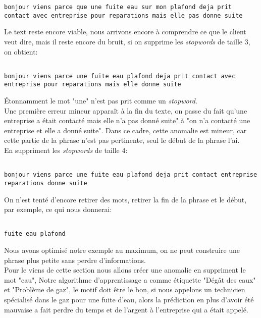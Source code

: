 \begin{lstlisting}
bonjour viens parce que une fuite eau sur mon plafond deja prit contact avec entreprise pour reparations mais elle pas donne suite
\end{lstlisting}

\pagebreak

Le text reste encore viable, nous arrivons encore à comprendre ce que le client veut dire, mais il reste encore du bruit, si on supprime les \textit{stopwords} de taille 3, on obtient:\\

\begin{lstlisting}

bonjour viens parce une fuite eau plafond deja prit contact avec entreprise pour reparations mais elle donne suite

\end{lstlisting}


Étonnamment le mot "une" n'est pas prit comme un \textit{stopword}.\\
Une première erreur mineur apparaît à la fin du texte, on passe du fait qu'une entreprise a était contacté mais elle n'a pas donné suite" à "on n'a contacté une entreprise et elle a donné suite".
Dans ce cadre, cette anomalie est mineur, car cette partie de la phrase n'est pas pertinente, seul le début de la phrase l'ai.\\
En suppriment les \textit{stopwords} de taille 4:\\
\begin{lstlisting}

bonjour viens parce une fuite eau plafond deja prit contact entreprise reparations donne suite

\end{lstlisting}

On n'est tenté d'encore retirer des mots, retirer la fin de la phrase et le début, par exemple, ce qui nous donnerai:\\

\begin{lstlisting}

fuite eau plafond

\end{lstlisting}

Nous avons optimisé notre exemple au maximum, on ne peut construire une phrase plus petite sans perdre d'informations.\\
\linebreak
Pour le viens de cette section nous allons créer une anomalie en suppriment le mot "eau", Notre algorithme d'apprentissage a comme étiquette "Dégât des eaux" et "Problème de gaz", le motif doit être le bon, si nous appelons un technicien spécialisé dans le gaz pour une fuite d'eau, alors la prédiction en plus d'avoir été mauvaise a fait perdre du temps et de l'argent à l'entreprise qui a était appelé.\\
\linebreak

